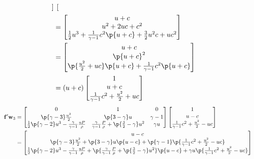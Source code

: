 \documentclass[11pt, oneside]{article}
\begin{document}
\begin{enumerate}
\begin{align*}
\begin{bmatrix}
      \end{bmatrix} \\
      &=
      \begin{bmatrix}
        u + c \\
        u^2 + 2uc + c^2 \\
        \frac{1}{2} u^3 + \frac{1}{\gamma - 1}c^2\p{u+c} + \frac{3}{2}u^2c + uc^2
      \end{bmatrix} \\
      &=
      \begin{bmatrix}
        u + c \\
        \p{u + c}^2 \\
        \p{\frac{u^2}{2} + uc}\p{u + c} + \frac{1}{\gamma - 1}c^2\p{u + c}
      \end{bmatrix} \\
      &= (u + c)
      \begin{bmatrix}
        1 \\
        u + c \\
        \frac{1}{\gamma - 1}c^2 + \frac{u^2}{2} + uc
      \end{bmatrix} \\
    \end{align*}
    \begin{align*}
      \v{f}' \v{w}_3 &= 
      \begin{bmatrix}
        0 & 1 & 0 \\
        \p{\gamma - 3} \frac{u^2}{2} & \p{3 - \gamma}u & \gamma - 1 \\
        \frac{1}{2}\p{\gamma - 2} u^3 - \frac{\gamma}{\gamma - 1}\frac{uP}{\rho} & \frac{\gamma}{\gamma - 1}\frac{P}{\rho} + \p{\frac{3}{2} - \gamma}u^2  & \gamma u
      \end{bmatrix}
      \begin{bmatrix}
        1 \\
        u - c \\
        \frac{1}{\gamma - 1}c^2 + \frac{u^2}{2} - uc \\
      \end{bmatrix} \\
      &=
      \begin{bmatrix}
        u - c \\
        \p{\gamma - 3} \frac{u^2}{2} + \p{3 - \gamma}u\p{u - c} + \p{\gamma - 1}\p{\frac{1}{\gamma - 1}c^2 + \frac{u^2}{2} - uc} \\
        \frac{1}{2}\p{\gamma - 2} u^3 - \frac{\gamma}{\gamma - 1}\frac{uP}{\rho} + \p{\frac{\gamma}{\gamma - 1}\frac{P}{\rho} + \p{\frac{3}{2} - \gamma}u^2}\p{u - c} + \gamma u \p{\frac{1}{\gamma - 1}c^2 + \frac{u^2}{2} - uc}

\end{bmatrix}
\end{align*}
\end{enumerate}
\end{document}

